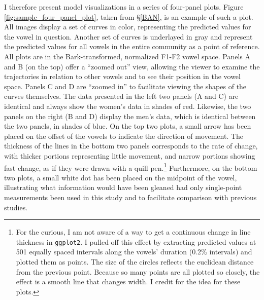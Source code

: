 I therefore present model visualizations in a series of four-panel plots. Figure \ref{fig:sample_four_panel_plot}, taken from \S\ref{BAN}, is an example of such a plot. All images display a set of curves in color, representing the predicted values for the vowel in question. Another set of curves is underlayed in gray and represent the predicted values for all vowels in the entire community as a point of reference. All plots are in the Bark-transformed, normalized F1-F2 vowel space. Panels A and B (on the top) offer a “zoomed out” view, allowing the viewer to examine the trajectories in relation to other vowels and to see their position in the vowel space. Panels C and D are ``zoomed in'' to facilitate viewing the shapes of the curves themselves. The data presented in the left two panels (A and C) are identical and always show the women’s data in shades of red. Likewise, the two panels on the right (B and D) display the men’s data, which is identical between the two panels, in shades of blue. On the top two plots, a small arrow has been placed on the offset of the vowels to indicate the direction of movement. The thickness of the lines in the bottom two panels corresponds to the rate of change, with thicker portions representing little movement, and narrow portions showing fast change, as if they were drawn with a quill pen.\footnote{For the curious, I am not aware of a way to get a continuous change in line thickness in \texttt{ggplot2}. I pulled off this effect by extracting predicted values at 501 equally spaced intervals along the vowels' duration (0.2\% intervals) and plotted them as points. The size of the circles reflects the euclidean distance from the previous point. Because so many points are all plotted so closely, the effect is a smooth line that changes width. I credit \citet{fruehwald_2017_gamm} for the idea for these plots.} Furthermore, on the bottom two plots, a small white dot has been placed on the midpoint of the vowel, illustrating what information would have been gleaned had only single-point measurements been used in this study and to facilitate comparison with previous studies.

